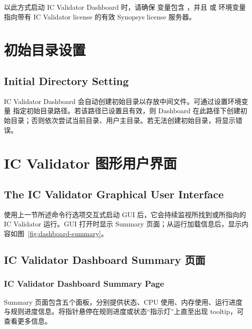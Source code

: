 \begin{noteBox}
以此方式启动 IC Validator Dashboard 时，请确保  变量包含 ，并且  或  环境变量指向带有 IC Validator license 的有效 Synopsys license 服务器。
\end{noteBox}

\section{初始目录设置}
\subsection*{Initial Directory Setting}

IC Validator Dashboard 会自动创建初始目录以存放中间文件。可通过设置环境变量  指定初始目录路径。若该路径已设置且有效，则 Dashboard 在此路径下创建初始目录；否则依次尝试当前目录、用户主目录。若无法创建初始目录，将显示错误。

\section{IC Validator 图形用户界面}
\subsection*{The IC Validator Graphical User Interface}

使用上一节所述命令行选项交互式启动 GUI 后，它会持续监视所找到或所指向的 IC Validator 运行。GUI 打开时显示 Summary 页面；从运行加载信息后，显示内容如图~\ref{fig:dashboard-summary}。

\subsection{IC Validator Dashboard Summary 页面}
\subsubsection*{IC Validator Dashboard Summary Page}

Summary 页面包含五个面板，分别提供状态、CPU 使用、内存使用、运行进度与规则进度信息。将指针悬停在规则进度或状态“指示灯”上直至出现 tooltip，可查看更多信息。


